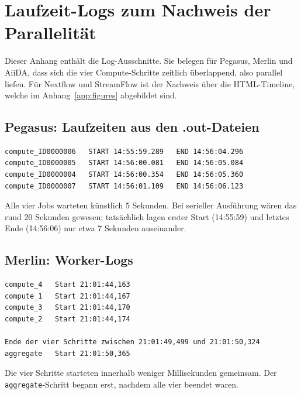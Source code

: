 \chapter{Laufzeit-Logs zum Nachweis der Parallelität}
\label{app:logs}

Dieser Anhang enthält die Log-Ausschnitte. Sie belegen für Pegasus, Merlin und AiiDA, dass sich die vier Compute-Schritte zeitlich
überlappend, also parallel liefen. Für Nextflow und StreamFlow ist der Nachweis über die HTML-Timeline, welche im Anhang~\ref{app:figures} abgebildet sind.

\section{Pegasus: Laufzeiten aus den .out-Dateien}
\label{app:logs:pegasus}

\begin{lstlisting}[caption={Start- und Endzeiten der vier compute-Jobs (Pegasus)},label={lst:logs:pegasus}]
compute_ID0000006   START 14:55:59.289   END 14:56:04.296
compute_ID0000005   START 14:56:00.081   END 14:56:05.084
compute_ID0000004   START 14:56:00.354   END 14:56:05.360
compute_ID0000007   START 14:56:01.109   END 14:56:06.123
\end{lstlisting}

Alle vier Jobs warteten künstlich 5 Sekunden. Bei serieller Ausführung wären das rund
20 Sekunden gewesen; tatsächlich lagen erster Start (14:55:59) und letztes Ende (14:56:06) nur
etwa 7 Sekunden auseinander.

\section{Merlin: Worker-Logs}
\label{app:logs:merlin}

\begin{lstlisting}[caption={Start- und Endzeiten der vier compute-Schritte (Merlin)},label={lst:logs:merlin}]
compute_4   Start 21:01:44,163
compute_1   Start 21:01:44,167
compute_3   Start 21:01:44,170
compute_2   Start 21:01:44,174

Ende der vier Schritte zwischen 21:01:49,499 und 21:01:50,324
aggregate   Start 21:01:50,365
\end{lstlisting}

Die vier Schritte starteten innerhalb weniger Millisekunden gemeinsam. Der
\texttt{aggregate}-Schritt begann erst, nachdem alle vier beendet waren.

